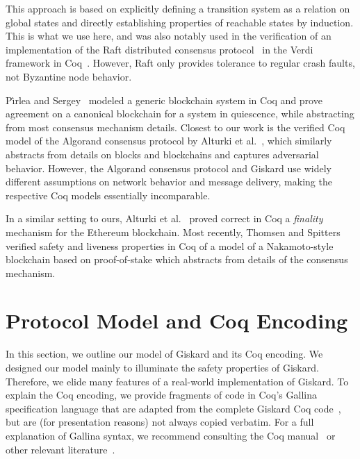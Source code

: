 \documentclass{easychair}
\begin{document}
 This approach is based on explicitly defining a transition system as a relation on global states and directly establishing properties of reachable states by induction. This is what we use here, and was also notably used in the verification of an implementation of the Raft distributed consensus protocol~\cite{Woos2016} in the Verdi framework in Coq~\cite{Wilcox2015}. However, Raft only provides tolerance to regular crash faults, not Byzantine node behavior. 

P{\^{\i}}rlea and Sergey~\cite{Pirlea2018} modeled a generic blockchain system in Coq and prove agreement on a canonical blockchain for a system in quiescence, while abstracting from most consensus mechanism details. Closest to our work is the verified Coq model of the Algorand consensus protocol by Alturki et al.~\cite{Alturki2020}, which similarly abstracts from details on blocks and blockchains and captures adversarial behavior. However, the Algorand consensus protocol and Giskard use widely different assumptions on network behavior and message delivery, making the respective Coq models essentially incomparable.

In a similar setting to ours, Alturki et al.~\cite{Gasper} proved correct in Coq a \emph{finality} mechanism for the Ethereum blockchain. Most recently, Thomsen and Spitters~\cite{Thomsen2020} verified safety and liveness properties in Coq of a model of a Nakamoto-style blockchain based on proof-of-stake which abstracts from details of the consensus mechanism.



\section{Protocol Model and Coq Encoding}
\label{sec:encoding}
In this section, we outline our model of Giskard and its Coq encoding. We designed our model mainly to illuminate the safety properties of Giskard. Therefore, we elide many features of a real-world implementation of Giskard. To explain the Coq encoding, we provide fragments of code in Coq's Gallina specification language that are adapted from the complete Giskard Coq code~\cite{CoqGiskard}, but are (for presentation reasons) not always copied verbatim. For a full explanation of Gallina syntax, we recommend consulting the Coq manual~\cite{Gallina812} or other relevant literature~\cite{CoqArt}.
\end{document}
